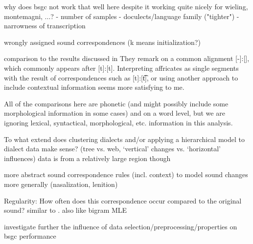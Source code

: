 \documentclass[a4paper]{article}
\begin{document}
why does bsgc not work that well here despite it working quite nicely for wieling, montemagni, ...?
- number of samples
- doculects/language family ("tighter")
- narrowness of transcription

wrongly assigned sound correspondences (k means initialization?)

comparison to the results discussed in \citet{wieling2011bipartite}
They remark on a common alignment [-]:[\textesh], which commonly appears after [t]:[t]. Interpreting affricates as single segments with the result of correspondences such as [t]:[\t{t\textesh}], or using another approach to include contextual information seems more satisfying to me.


All of the comparisons here are phonetic (and might possibly include some morphological information in some cases) and on a word level, but we are ignoring lexical, syntactical, morphological, etc. information in this analysis.

To what extend does clustering dialects and/or applying a hierarchical model to dialect data make sense? (tree vs. web, `vertical' changes vs. `horizontal' influences)
data is from a relatively large region though

more abstract sound correspondence rules (incl. context) to model sound changes more generally (nasalization, lenition)

Regularity: How often does this correspondence occur compared to the original sound? similar to \citet{prokic2013combining}. also like bigram MLE

investigate further the influence of data selection/preprocessing/properties on bsgc performance

\newpage


\end{document}
